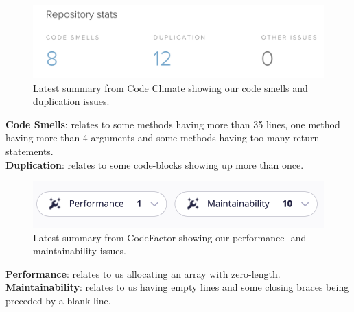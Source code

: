 \begin{figure}[H]
  \centering
  \includegraphics[width=\textwidth]{Images/codeclimate_stats.png}
  \caption{Latest summary from Code Climate showing our code smells and duplication issues.}
  \label{fig:codeclimate_stats}
\end{figure}

\textbf{Code Smells}: relates to some methods having more than 35 lines, one method having more than 4 arguments and some methods having too many return-statements. \\
\textbf{Duplication}: relates to some code-blocks showing up more than once.

\begin{figure}[H]
  \centering
  \includegraphics[width=\textwidth]{Images/codefactor_stats.png}
  \caption{Latest summary from CodeFactor showing our performance- and maintainability-issues.}
  \label{fig:codefactor_stats}
\end{figure}

\textbf{Performance}: relates to us allocating an array with zero-length. \\
\textbf{Maintainability}: relates to us having empty lines and some closing braces being preceded by a blank line.